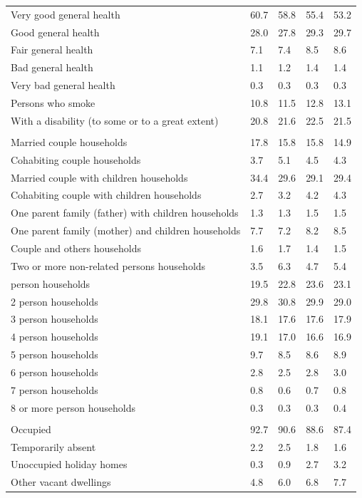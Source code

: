 \documentclass{article}
\begin{document}
\begin{table}[h]
\begin{tabular}{KTTTT}
    \hline
Very good general health & 60.7& 58.8&55.4& 53.2\\
Good general health & 28.0& 27.8& 29.3& 29.7\\
Fair general health & 7.1& 7.4&8.5& 8.6\\
Bad general health & 1.1& 1.2&1.4& 1.4\\
Very bad general health & 0.3& 0.3&0.3& 0.3\\
    \hline
Persons who smoke & 10.8& 11.5&12.8& 13.1\\
    \hline
With a disability (to some or to a great extent) & 20.8& 21.6&22.5& 21.5\\
\hline
    \\ 
    \hline
Married couple households & 17.8& 15.8& 15.8& 14.9\\
Cohabiting couple households & 3.7& 5.1& 4.5& 4.3\\
Married couple with children households & 34.4& 29.6& 29.1& 29.4\\
Cohabiting couple with children households & 2.7& 3.2& 4.2& 4.3\\
One parent family (father) with  children households & 1.3& 1.3& 1.5& 1.5\\
One parent family (mother) and children households & 7.7& 7.2& 8.2& 8.5\\
Couple and others households  & 1.6& 1.7& 1.4& 1.5\\
Two or more non-related persons households & 3.5& 6.3& 4.7& 5.4\\
     person households & 19.5& 22.8& 23.6& 23.1\\
2 person households & 29.8& 30.8& 29.9& 29.0\\
3 person households & 18.1& 17.6& 17.6& 17.9\\
4 person households & 19.1& 17.0& 16.6& 16.9\\
5 person households & 9.7& 8.5& 8.6& 8.9\\
6 person households & 2.8& 2.5& 2.8& 3.0\\
7 person households & 0.8& 0.6& 0.7& 0.8\\
8 or more person households & 0.3& 0.3& 0.3& 0.4\\
\hline
    \\ 
    \hline
Occupied & 92.7& 90.6& 88.6& 87.4\\
Temporarily absent & 2.2& 2.5& 1.8& 1.6\\
Unoccupied holiday homes & 0.3& 0.9& 2.7& 3.2\\
Other vacant dwellings & 4.8& 6.0& 6.8& 7.7\\
\hline
\end{tabular}
\end{table}
\end{document}
